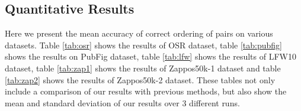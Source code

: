 \documentclass[10pt,twocolumn,letterpaper]{article}
\begin{document}
\subsection{Quantitative Results}

Here we present the mean accuracy of correct ordering of pairs on various datasets. Table \ref{tab:osr} shows the results of OSR dataset, table \ref{tab:pubfig} shows the results on PubFig dataset, table \ref{tab:lfw} shows the results of LFW10 dataset, table \ref{tab:zap1} shows the results of Zappos50k-1 dataset and table \ref{tab:zap2} shows the results of Zappos50k-2 dataset.
These tables not only include a comparison of our results with previous methods, but also show the mean and standard deviation of our results over 3 different runs.

\begin{table}[t!]
\caption{Results for the OSR dataset}
\centering
{}
\label{tab:osr}
\end{table}
\end{document}

